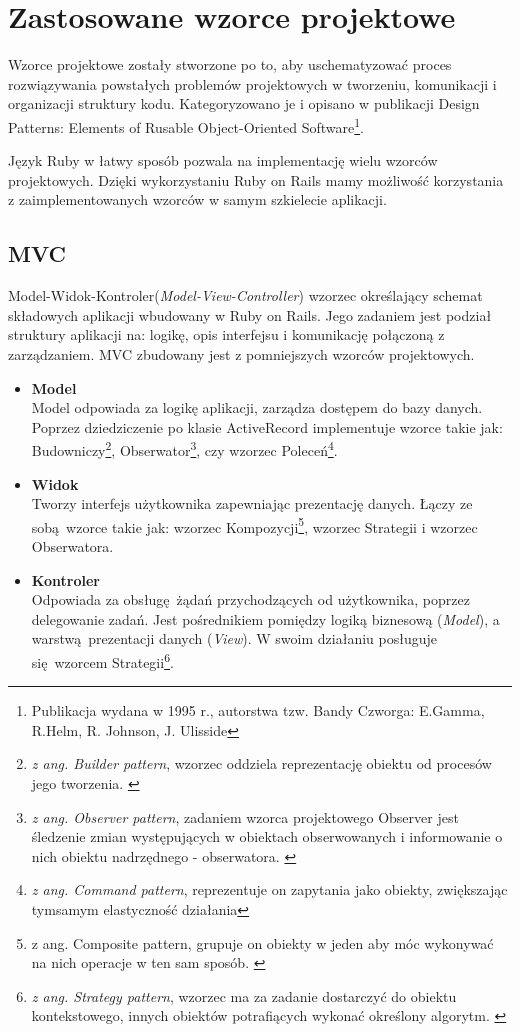 \section{Zastosowane wzorce projektowe}
\label{sec:patterns}
Wzorce projektowe zostały stworzone po to, aby uschematyzować proces rozwiązywania powstałych problemów projektowych w tworzeniu, komunikacji i organizacji struktury kodu. Kategoryzowano je i opisano w publikacji Design Patterns: Elements of Rusable Object-Oriented Software\footnote{Publikacja wydana w 1995 r., autorstwa tzw. Bandy Czworga: E.Gamma, R.Helm, R. Johnson, J. Ulisside}.

Język Ruby w łatwy sposób pozwala na implementację wielu wzorców projektowych. Dzięki wykorzystaniu Ruby on Rails mamy możliwość korzystania z zaimplementowanych wzorców w samym szkielecie aplikacji.
  \subsection{MVC}
   Model-Widok-Kontroler(\emph{Model-View-Controller}) wzorzec określający schemat składowych aplikacji wbudowany w Ruby on Rails. Jego zadaniem jest podział struktury aplikacji na: logikę, opis interfejsu i komunikację połączoną z zarządzaniem.
   MVC zbudowany jest z pomniejszych wzorców projektowych.
    \begin{itemize}
      \item \textbf {Model} \\
      Model odpowiada za logikę aplikacji, zarządza dostępem do bazy danych.
      Poprzez dziedziczenie po klasie ActiveRecord implementuje wzorce takie jak: Budowniczy\footnote{\emph{z ang. Builder pattern}, wzorzec oddziela reprezentację obiektu od procesów jego tworzenia. \cite{ruby_patterns}}, Obserwator\footnote{\emph{z ang. Observer pattern}, zadaniem wzorca projektowego Observer jest śledzenie zmian występujących w obiektach obserwowanych i informowanie o nich obiektu nadrzędnego - obserwatora. \cite{ruby_patterns}}, czy wzorzec Poleceń\footnote{\emph{z ang. Command pattern}, reprezentuje on zapytania jako obiekty, zwiększając tymsamym elastyczność działania\cite{ruby_patterns}}.

      \item \textbf {Widok} \\
      Tworzy interfejs użytkownika zapewniając prezentację danych. Łączy ze sobą wzorce takie jak: wzorzec Kompozycji\footnote{z ang. Composite pattern, grupuje on obiekty w jeden aby móc wykonywać na nich operacje w ten sam sposób. \cite{ruby_patterns}}, wzorzec Strategii i wzorzec Obserwatora.

      \item \textbf {Kontroler} \\
      Odpowiada za obsługę żądań przychodzących od użytkownika, poprzez delegowanie zadań. Jest pośrednikiem pomiędzy logiką biznesową (\emph{Model}), a warstwą prezentacji danych (\emph{View}). W swoim działaniu posługuje się wzorcem Strategii\footnote{ \emph{z ang. Strategy pattern}, wzorzec ma za zadanie dostarczyć do obiektu kontekstowego, innych obiektów potrafiących wykonać określony algorytm. \cite{ruby_patterns}}.
    \end{itemize}

